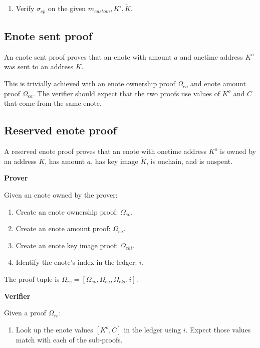 \begin{appendices}
\begin{enumerate}
    \item Verify $\sigma_{cp}$ on the given $m_{custom}, K', \tilde{K}$.
\end{enumerate}


\subsection{Enote sent proof}
\label{appendix:jamtis-information-proofs-enote-sent}

An enote sent proof proves that an enote with amount $a$ and onetime address $K^o$ was sent to an address $K$.

This is trivially achieved with an enote ownership proof $\Omega_{eo}$ and enote amount proof $\Omega_{ea}$. The verifier should expect that the two proofs use values of $K^o$ and $C$ that come from the same enote.


\subsection{Reserved enote proof}
\label{appendix:jamtis-information-proofs-reserved-enote}

A reserved enote proof proves that an enote with onetime address $K^o$ is owned by an address $K$, has amount $a$, has key image $\tilde{K}$, is onchain, and is unspent.

\textbf{Prover}

Given an enote owned by the prover:

\begin{enumerate}
    \item Create an enote ownership proof: $\Omega_{eo}$.

    \item Create an enote amount proof: $\Omega_{ea}$.

    \item Create an enote key image proof: $\Omega_{eki}$.

    \item Identify the enote's index in the ledger: $i$.
\end{enumerate}

The proof tuple is $\Omega_{re} = [\Omega_{eo}, \Omega_{ea}, \Omega_{eki}, i]$.

\textbf{Verifier}

Given a proof $\Omega_{re}$:

\begin{enumerate}
    \item Look up the enote values $[K^o, C]$ in the ledger using $i$. Expect those values match with each of the sub-proofs.


\end{enumerate}
\end{appendices}
